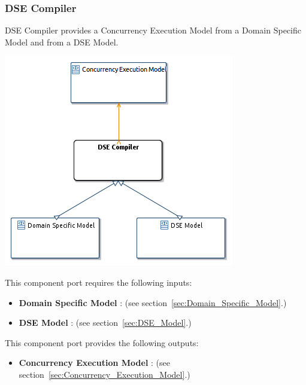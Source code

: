 \documentclass{gemoc} %
\begin{document}
\subsubsection{DSE Compiler}
\label{sec:DSE_Compiler}
DSE Compiler provides a Concurrency Execution Model from a Domain Specific Model and from a DSE Model.
\begin{center}
\includegraphics*[trim=0.0cm 0.0cm 0cm 0.0cm, clip=true]{../images/generated/Generated_DSE_Compiler.png}
\end{center}

This component port requires the following inputs:
\begin{itemize}
  \item \textbf{Domain Specific Model} :
(see section~\ref{sec:Domain_Specific_Model}.)
  \item \textbf{DSE Model} :
(see section~\ref{sec:DSE_Model}.)
\end{itemize}

This component port provides the following outputs:
\begin{itemize}
  \item \textbf{Concurrency Execution Model} :
(see section~\ref{sec:Concurrency_Execution_Model}.)
\end{itemize}
\end{document}
